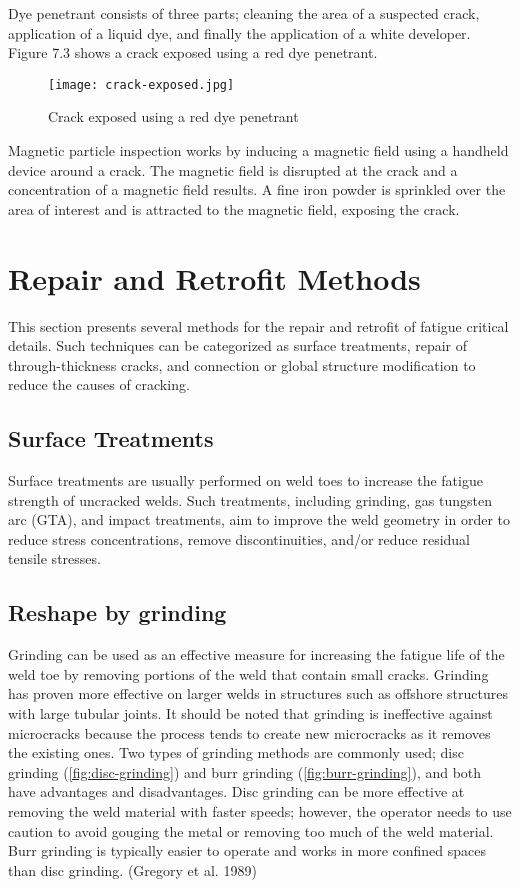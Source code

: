 Dye penetrant consists of three parts; cleaning the area of a suspected crack, application of a liquid dye, and
finally the application of a white developer. Figure 7.3 shows a crack exposed using a red dye penetrant.

\begin{figure}
  \texttt{[image: crack-exposed.jpg]}
  \caption{Crack exposed using a red dye penetrant}
  \label{fig:crack-exposed}
\end{figure}

Magnetic particle inspection works by inducing a magnetic field using a handheld device around a crack. The
magnetic field is disrupted at the crack and a concentration of a magnetic field results. A fine iron powder is
sprinkled over the area of interest and is attracted to the magnetic field, exposing the crack.

\section{Repair and Retrofit Methods}
This section presents several methods for the repair and retrofit of fatigue critical details. Such techniques can be
categorized as surface treatments, repair of through-thickness cracks, and connection or global structure modification
to reduce the causes of cracking.

\subsection{Surface Treatments}
Surface treatments are usually performed on weld toes to increase the fatigue strength of uncracked welds. Such
treatments, including grinding, gas tungsten arc (GTA), and impact treatments, aim to improve the weld geometry in
order to reduce stress concentrations, remove discontinuities, and/or reduce residual tensile stresses.

\subsection{Reshape by grinding}
Grinding can be used as an effective measure for increasing the fatigue life of the weld toe by removing portions
of the weld that contain small cracks. Grinding has proven more effective on larger welds in structures such as
offshore structures with large tubular joints. It should be noted that grinding is ineffective against microcracks
because the process tends to create new microcracks as it removes the existing ones. Two types of grinding methods
are commonly used; disc grinding (\cref{fig:disc-grinding}) and burr grinding (\cref{fig:burr-grinding}), and both have advantages and
disadvantages. Disc grinding can be more effective at removing the weld material with faster speeds; however, the
operator needs to use caution to avoid gouging the metal or removing too much of the weld material. Burr grinding is
typically easier to operate and works in more confined spaces than disc grinding. (Gregory et al. 1989)

